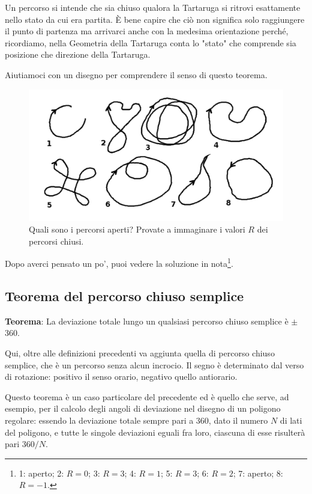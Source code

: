 Un percorso si intende che sia chiuso qualora la Tartaruga si ritrovi esattamente nello stato da cui era partita. È bene capire che ciò non significa solo raggiungere il punto di partenza ma arrivarci anche con la medesima orientazione perché, ricordiamo, nella Geometria della Tartaruga conta lo "stato" che comprende sia posizione che direzione della Tartaruga.

Aiutiamoci con un disegno per comprendere il senso di questo teorema.

\begin{figure}[H]
   \centering
   \includegraphics[width=12.0cm]{./images/marta/percorsi.png}
   \caption{Quali sono i percorsi aperti? Provate a immaginare i valori $R$ dei percorsi chiusi.}
   \label{percorsi}
\end{figure}

Dopo averci pensato un po', puoi vedere la soluzione in nota\footnote{1: aperto; 2: $R=0$; 3: $R=3$; 4: $R=1$; 5: $R=3$; 6: $R=2$; 7: aperto; 8: $R=-1$.}.

\subsection{Teorema del percorso chiuso semplice}

\textbf{Teorema}: La deviazione totale lungo un qualsiasi percorso chiuso semplice è $\pm$360\degree.

Qui, oltre alle definizioni precedenti va aggiunta quella di percorso chiuso semplice, che è un percorso senza alcun incrocio. Il segno è determinato dal verso di rotazione: positivo il senso orario, negativo quello antiorario.

Questo teorema è un caso particolare del precedente ed è quello che serve, ad esempio, per il calcolo degli angoli di deviazione nel disegno di un poligono regolare: essendo la deviazione totale sempre pari a 360\degree, dato il numero $N$ di lati del poligono, e tutte le singole deviazioni eguali fra loro, ciascuna di esse risulterà pari $360/N$. 

